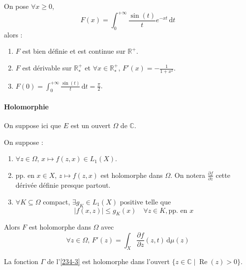 
  \begin{application}
    On pose $\forall x \geq 0$,
    \[ F(x) = \int_0^{+\infty} \frac{\sin(t)}{t} e^{-xt} \, \mathrm{d}t \]
    alors :
    \begin{enumerate}[label=(\roman*)]
      \item $F$ est bien définie et est continue sur $\mathbb{R}^+$.
      \item $F$ est dérivable sur $\mathbb{R}^+_*$ et $\forall x \in \mathbb{R}^+_*$, $F'(x) = -\frac{1}{1+x^2}$.
      \item $F(0) = \int_0^{+\infty} \frac{\sin(t)}{t} \, \mathrm{d}t = \frac{\pi}{2}$.
    \end{enumerate}
  \end{application}

  \paragraph{Holomorphie}


  On suppose ici que $E$ est un ouvert $\Omega$ de $\mathbb{C}$.

  \begin{theorem}
    On suppose :
    \begin{enumerate}[label=(\roman*)]
      \item $\forall z \in \Omega$, $x \mapsto f(z,x) \in L_1(X)$.
      \item pp. en $x \in X$, $z \mapsto f(z,x)$ est holomorphe dans $\Omega$. On notera $\frac{\partial f}{\partial z}$ cette dérivée définie presque partout.
      \item $\forall K \subseteq \Omega$ compact, $\exists g_K \in L_1(X)$ positive telle que
      \[ \left| f(x,z) \right| \leq g_K(x) \quad \forall z \in K, \text{pp. en } x \]
    \end{enumerate}
    Alors $F$ est holomorphe dans $\Omega$ avec
    \[ \forall z \in \Omega, \, F'(z) = \int_X \frac{\partial f}{\partial z}(z, t) \, \mathrm{d}\mu(z) \]
  \end{theorem}


  \begin{example}
    La fonction $\Gamma$ de l'\cref{234-3} est holomorphe dans l'ouvert $\{ z \in \mathbb{C} \mid \operatorname{Re}(z) > 0 \}$.
  \end{example}

